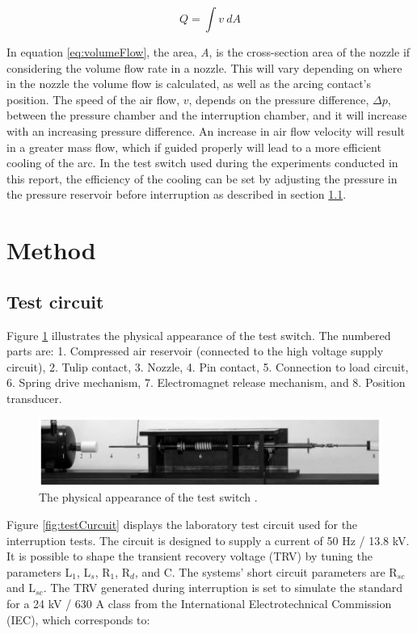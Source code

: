 \documentclass[10pt,b5paper,twoside]{article}
\begin{document}
\begin{equation} \label{eq:volumeFlow}
Q=\int v \ dA
\end{equation}

In equation \eqref{eq:volumeFlow}, the area, \textit{A}, is the cross-section area of the nozzle if considering the volume flow rate in a nozzle. This will vary depending on where in the nozzle the volume flow is calculated, as well as the arcing contact's position. The speed of the air flow, $v$, depends on the pressure difference, $\Delta p$, between the pressure chamber and the interruption chamber, and it will increase with an increasing pressure difference. An increase in air flow velocity will result in a greater mass flow, which if guided properly will lead to a more efficient cooling of the arc. In the test switch used during the experiments conducted in this report, the efficiency of the cooling can be set by adjusting the pressure in the pressure reservoir before interruption as described in section \ref{sec:testCir}.

\cleardoublepage
\section{Method}

\subsection{Test circuit} \label{sec:testCir}

Figure \ref{fig:testSwitchRiggEq} illustrates the physical appearance of the test switch. The numbered parts are: 1. Compressed air reservoir (connected to the high voltage supply circuit), 2. Tulip contact, 3. Nozzle, 4. Pin contact, 5. Connection to load circuit, 6. Spring drive mechanism, 7. Electromagnet release mechanism, and 8. Position transducer.

\begin{figure} [H]
\centering
\includegraphics[scale=0.4]{Bilder/Method/switchTest.png}
\caption{The physical appearance of the test switch \cite{bib:AFIMVLBA}.} \label{fig:testSwitchRiggEq}
\end{figure}

Figure \ref{fig:testCurcuit} displays the laboratory test circuit used for the interruption tests. The circuit is designed to supply a current of 50 Hz / 13.8 kV. It is possible to shape the transient recovery voltage (TRV) by tuning the parameters L$_1$, L$_s$, R$_1$, R$_d$, and C. The systems' short circuit parameters are R$_{sc}$ and L$_{sc}$. The TRV generated during interruption is set to simulate the standard for a 24 kV / 630 A class from the International Electrotechnical Commission (IEC), which corresponds to:
\end{document}
